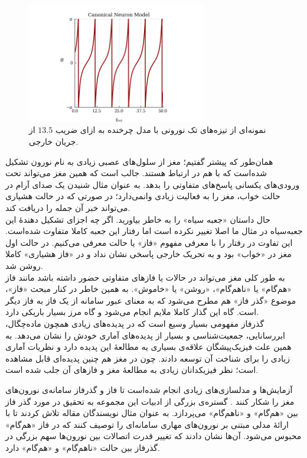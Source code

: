 \begin{figure}
	\centering
	\includegraphics[width=0.7\textwidth]{Figures/canonical_model_spike_pattern.png}
	\caption{
		نمونه‌ای از تیزه‌های تک نورونی با مدل چرخنده  به ازای ضریب $13.5$ از جریان خارجی.}
	\label{fig:canonical_model_spike_pattern}
\end{figure}
همان‌طور که پیشتر گفتیم؛ مغز از سلول‌های عصبی زیادی به نام نورون تشکیل شده‌است که با هم در ارتباط هستند. جالب است که همین مغز می‌تواند تحت ورودی‌های یکسانی پاسخ‌های متفاوتی را بدهد. به عنوان مثال شنیدن یک صدای آرام در حالت خواب، مغز را به فعالیت زیادی وانمی‌دارد؛ در صورتی که در حالت هشیاری می‌تواند خبر آن جمله را دریافت کند.\\
حال داستان «جعبه سیاه» را به خاطر بیاورید. اگر چه اجزای تشکیل دهندهٔ این جعبه‌سیاه در مثال ما اصلا تغییر نکرده است اما رفتار این جعبه کاملا متفاوت شده‌است. این تفاوت در رفتار را با معرفی مفهوم «فاز» یا حالت معرفی می‌کنیم. در حالت اول مغز در «خواب» بود و به تحریک خارجی پاسخی نشان نداد و در «فاز هشیاری» کاملا روشن شد.\\
به طور کلی مغز می‌تواند در حالات یا فازهای متفاوتی حضور داشته باشد مانند فاز «هم‌گام» یا «ناهم‌گام»، «روشن» یا «خاموش». به همین خاطر در کنار مبحث «فاز»، موضوع «گذر فاز»  هم مطرح می‌شود که به معنای عبور سامانه از یک فاز به فاز دیگر است. گاه این گذار کاملا ملایم انجام می‌شود و گاه مرز بسیار باریکی دارد.\\

گذرفاز مفهومی بسیار وسیع است که در پدیده‌های زیادی همچون ماده‌چگال، ابررسانایی، جمعیت‌شناسی و بسیار از پدیده‌های آماری خودش را نشان می‌دهد. به همین علت فیزیک‌پیشگان علاقه‌ی بسیاری یه مطالعهٔ این پدیده دارد و نظریات آماری زیادی را برای شناخت آن توسعه دادند. چون در مغز هم چنین پدیده‌ای قابل مشاهده است؛ نظر فیزیکدانان زیادی به مطالعهٔ مغز و فازهای آن جلب شده است.

آزمایش‌ها و مدلسازی‌های زیادی انجام شده‌است تا فاز و گذرفاز سامانه‌ی نورون‌های مغز را شکار کنند 
\cite{WILTING2019105}.
گستره‌ی بزرگی از ادبیات این مجموعه به تحقیق در مورد گذر فاز بین «هم‌گام» و «نا‌هم‌گام» می‌پردازد. به عنوان مثال نویسندگان مقاله
\cite{PhysRevLett.105.158104}
تلاش کردند تا با ارائهٔ مدلی مبتنی بر نورون‌های مهاری سامانه‌ای را توصیف کنند که در فاز «هم‌گام» محبوس می‌شود. آن‌ها نشان دادند که تغییر قدرت اتصالات بین نورون‌ها سهم بزرگی در گذرفاز بین حالت «ناهم‌گام» و «هم‌گام» دارد.

